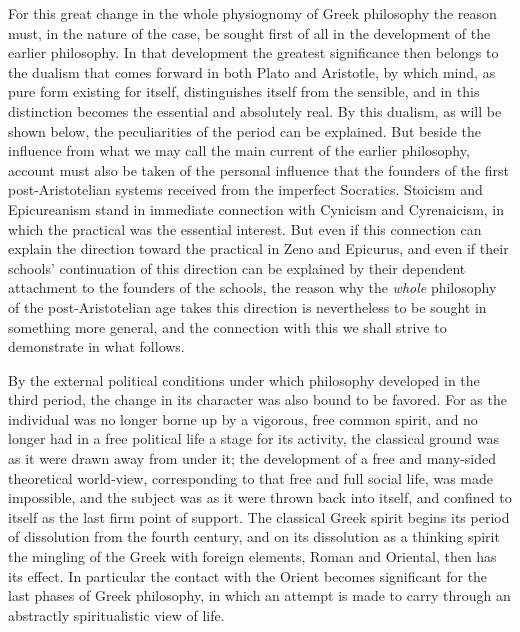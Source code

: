 For this great change in the whole physiognomy of Greek philosophy the reason
must, in the nature of the case, be sought first of all in the development of
the earlier philosophy. In that development the greatest significance then
belongs to the dualism that comes forward in both Plato and Aristotle, by
which mind, as pure form existing for itself, distinguishes itself from the
sensible, and in this distinction becomes the essential and absolutely real.
By this dualism, as will be shown below, the peculiarities of the period can be
explained. But beside the influence from what we may call the main current of
the earlier philosophy, account must also be taken of the personal influence
that the founders of the first post-Aristotelian systems received from the
imperfect Socratics. Stoicism and Epicureanism stand in immediate connection
with Cynicism and Cyrenaicism, in which the practical was the essential
interest. But even if this connection can explain the direction toward the
practical in Zeno and Epicurus, and even if their schools' continuation of
this direction can be explained by their dependent attachment to the founders
of the schools, the reason why the \emph{whole} philosophy of the
post-Aristotelian age takes this direction is nevertheless to be sought in
something more general, and the connection with this we shall strive to
demonstrate in what follows.

By the external political conditions under which philosophy developed in the
third period, the change in its character was also bound to be favored. For
as the individual was no longer borne up by a vigorous, free common spirit,
and no longer had in a free political life a stage for its activity, the
classical ground was as it were drawn away from under it; the development of a
free and many-sided theoretical world-view, corresponding to that free and
full social life, was made impossible, and the subject was as it were thrown
back into itself, and confined to itself as the last firm point of support.
The classical Greek spirit begins its period of dissolution from
the fourth century, and on its dissolution as a thinking spirit the mingling
of the Greek with foreign elements, Roman and Oriental, then has its effect.
In particular the contact with the Orient becomes significant for the last
phases of Greek philosophy, in which an attempt is made to carry through an
abstractly spiritualistic view of life.

